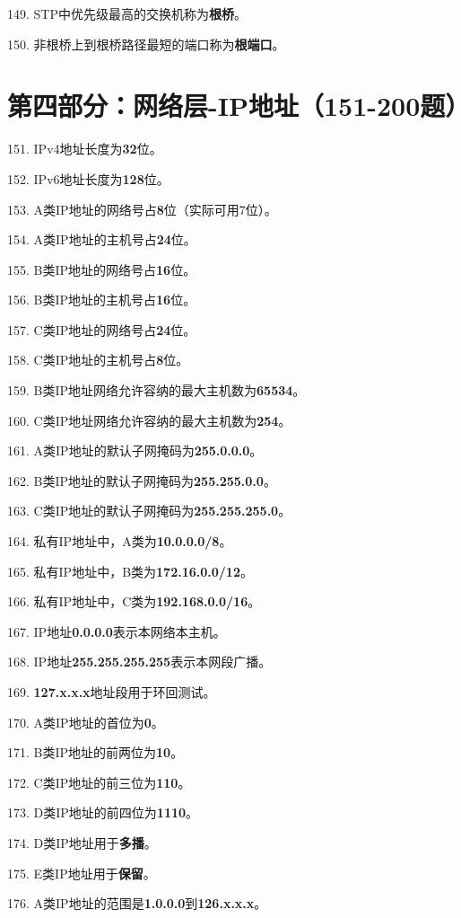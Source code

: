 \documentclass[12pt,a4paper,openany]{ctexbook}
\begin{document}
149. STP中优先级最高的交换机称为\textbf{根桥}。

150. 非根桥上到根桥路径最短的端口称为\textbf{根端口}。

\section{第四部分：网络层-IP地址（151-200题）}

151. IPv4地址长度为\textbf{32}位。

152. IPv6地址长度为\textbf{128}位。

153. A类IP地址的网络号占\textbf{8}位（实际可用7位）。

154. A类IP地址的主机号占\textbf{24}位。

155. B类IP地址的网络号占\textbf{16}位。

156. B类IP地址的主机号占\textbf{16}位。

157. C类IP地址的网络号占\textbf{24}位。

158. C类IP地址的主机号占\textbf{8}位。

159. B类IP地址网络允许容纳的最大主机数为\textbf{65534}。

160. C类IP地址网络允许容纳的最大主机数为\textbf{254}。

161. A类IP地址的默认子网掩码为\textbf{255.0.0.0}。

162. B类IP地址的默认子网掩码为\textbf{255.255.0.0}。

163. C类IP地址的默认子网掩码为\textbf{255.255.255.0}。

164. 私有IP地址中，A类为\textbf{10.0.0.0/8}。

165. 私有IP地址中，B类为\textbf{172.16.0.0/12}。

166. 私有IP地址中，C类为\textbf{192.168.0.0/16}。

167. IP地址\textbf{0.0.0.0}表示本网络本主机。

168. IP地址\textbf{255.255.255.255}表示本网段广播。

169. \textbf{127.x.x.x}地址段用于环回测试。

170. A类IP地址的首位为\textbf{0}。

171. B类IP地址的前两位为\textbf{10}。

172. C类IP地址的前三位为\textbf{110}。

173. D类IP地址的前四位为\textbf{1110}。

174. D类IP地址用于\textbf{多播}。

175. E类IP地址用于\textbf{保留}。

176. A类IP地址的范围是\textbf{1.0.0.0}到\textbf{126.x.x.x}。
\end{document}
